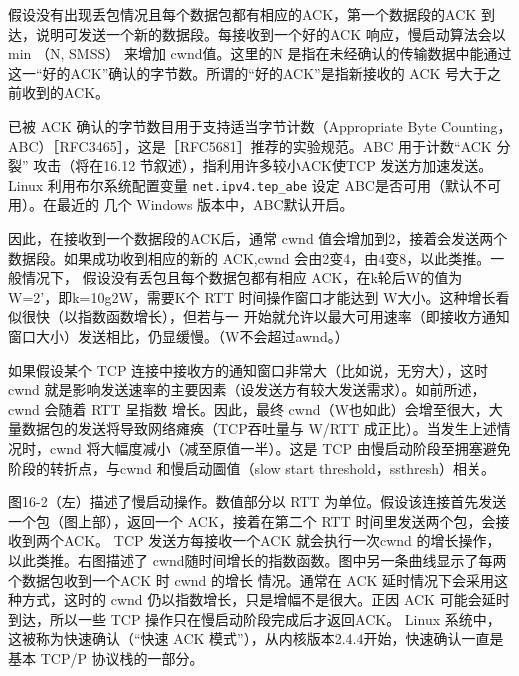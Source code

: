 假设没有出现丢包情况且每个数据包都有相应的ACK，第一个数据段的ACK 到达，说明可发送一个新的数据段。每接收到一个好的ACK 响应，慢启动算法会以 min （N, SMSS）
来增加 cwnd值。这里的N 是指在未经确认的传输数据中能通过这一“好的ACK”确认的字节数。所谓的“好的ACK”是指新接收的 ACK 号大于之前收到的ACK。

\begin{tcolorbox}
    已被 ACK 确认的字节数目用于支持适当字节计数（Appropriate Byte Counting，ABC）［RFC3465］，这是［RFC5681］推荐的实验规范。ABC 用于计数“ACK 分裂”
    攻击（将在16.12 节叙述），指利用许多较小ACK使TCP 发送方加速发送。Linux 利用布尔系统配置变量 \verb|net.ipv4.tep_abe| 设定 ABC是否可用（默认不可用）。在最近的
    几个 Windows 版本中，ABC默认开启。
\end{tcolorbox}

因此，在接收到一个数据段的ACK后，通常 cwnd 值会增加到2，接着会发送两个数据段。如果成功收到相应的新的 ACK,cwnd 会由2变4，由4变8，以此类推。一般情况下，
假设没有丢包且每个数据包都有相应 ACK，在k轮后W的值为W=2’，即k=10g2W，需要K个 RTT 时间操作窗口才能达到 W大小。这种增长看似很快（以指数函数增长），但若与一
开始就允许以最大可用速率（即接收方通知窗口大小）发送相比，仍显缓慢。（W不会超过awnd。）

如果假设某个 TCP 连接中接收方的通知窗口非常大（比如说，无穷大），这时 cwnd 就是影响发送速率的主要因素（设发送方有较大发送需求）。如前所述，cwnd 会随着 RTT 呈指数
增长。因此，最终 cwnd（W也如此）会增至很大，大量数据包的发送将导致网络瘫痪（TCP吞吐量与 W/RTT 成正比）。当发生上述情况时，cwnd 将大幅度减小（减至原值一半）。这是
TCP 由慢启动阶段至拥塞避免阶段的转折点，与cwnd 和慢启动圖值（slow start threshold，ssthresh）相关。

图16-2（左）描述了慢启动操作。数值部分以 RTT 为单位。假设该连接首先发送一个包（图上部），返回一个 ACK，接着在第二个 RTT 时间里发送两个包，会接收到两个ACK。
TCP 发送方每接收一个ACK 就会执行一次cwnd 的增长操作，以此类推。右图描述了 cwnd随时间增长的指数函数。图中另一条曲线显示了每两个数据包收到一个ACK 时 cwnd 的增长
情况。通常在 ACK 延时情况下会采用这种方式，这时的 cwnd 仍以指数增长，只是增幅不是很大。正因 ACK 可能会延时到达，所以一些 TCP 操作只在慢启动阶段完成后才返回ACK。
Linux 系统中，这被称为快速确认（“快速 ACK 模式”），从内核版本2.4.4开始，快速确认一直是基本 TCP/P 协议栈的一部分。

